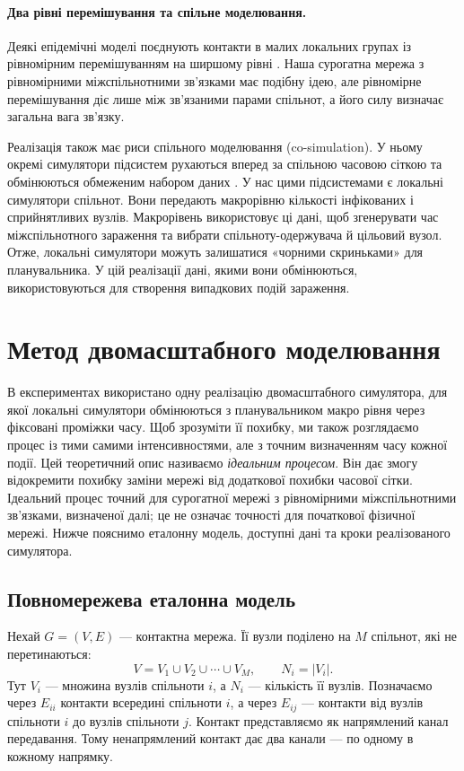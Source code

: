\documentclass[a4paper,fleqn]{cas-sc}
\begin{document}
\paragraph{Два рівні перемішування та спільне моделювання.}
Деякі епідемічні моделі поєднують контакти в малих локальних групах із рівномірним перемішуванням на ширшому рівні \citep{ball1997}. Наша сурогатна мережа з рівномірними міжспільнотними зв’язками має подібну ідею, але рівномірне перемішування діє лише між зв'язаними парами спільнот, а його силу визначає загальна вага зв'язку.

Реалізація також має риси спільного моделювання (co-simulation). У ньому окремі симулятори підсистем рухаються вперед за спільною часовою сіткою та обмінюються обмеженим набором даних \citep{gomes2018cosim}. У нас цими підсистемами є локальні симулятори спільнот. Вони передають макрорівню кількості інфікованих і сприйнятливих вузлів. Макрорівень використовує ці дані, щоб згенерувати час міжспільнотного зараження та вибрати спільноту-одержувача й цільовий вузол. Отже, локальні симулятори можуть залишатися «чорними скриньками» для планувальника. У цій реалізації дані, якими вони обмінюються, використовуються для створення випадкових подій зараження.

\section{Метод двомасштабного моделювання}
\label{sec:method}

В експериментах використано одну реалізацію двомасштабного симулятора, для якої локальні симулятори обмінюються з планувальником макро рівня через фіксовані проміжки часу. Щоб зрозуміти її похибку, ми також розглядаємо процес із тими самими інтенсивностями, але з точним визначенням часу кожної події. Цей теоретичний опис називаємо \emph{ідеальним процесом}. Він дає змогу відокремити похибку заміни мережі від додаткової похибки часової сітки. Ідеальний процес точний для сурогатної мережі з рівномірними міжспільнотними зв’язками, визначеної далі; це не означає точності для початкової фізичної мережі. Нижче пояснимо еталонну модель, доступні дані та кроки реалізованого симулятора.

\subsection{Повномережева еталонна модель}
\label{sec:reference}

Нехай $G=(V,E)$ --- контактна мережа. Її вузли поділено на $M$ спільнот, які не перетинаються:
\begin{equation}
\label{eq:partition}
V=V_1\cup V_2\cup\cdots\cup V_M,
\qquad N_i=|V_i|.
\end{equation}
Тут $V_i$ --- множина вузлів спільноти $i$, а $N_i$ --- кількість її вузлів. Позначаємо через $E_{ii}$ контакти всередині спільноти $i$, а через $E_{ij}$ --- контакти від вузлів спільноти $i$ до вузлів спільноти $j$. Контакт представляємо як напрямлений канал передавання. Тому ненапрямлений контакт дає два канали --- по одному в кожному напрямку.
\end{document}

